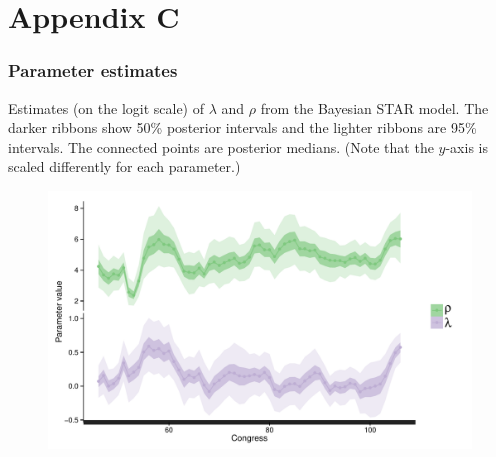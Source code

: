 \chapter*{Appendix C}\label{AppendixC}
\vspace{-1.75cm}
\subsection{Parameter estimates}

Estimates (on the logit scale) of $\lambda$ and $\rho$ from the Bayesian STAR model. 
The darker ribbons show 50\% posterior intervals and the lighter ribbons are 95\% 
intervals. The connected points are posterior medians. 
(Note that the $y$-axis is scaled differently for each parameter.) 

\vspace{.5cm}

\begin{figure}[h]
\centering
	\includegraphics[scale=0.8]{sections/figs/lambda_rho}
\label{fig:lambda_rho}
\end{figure}

